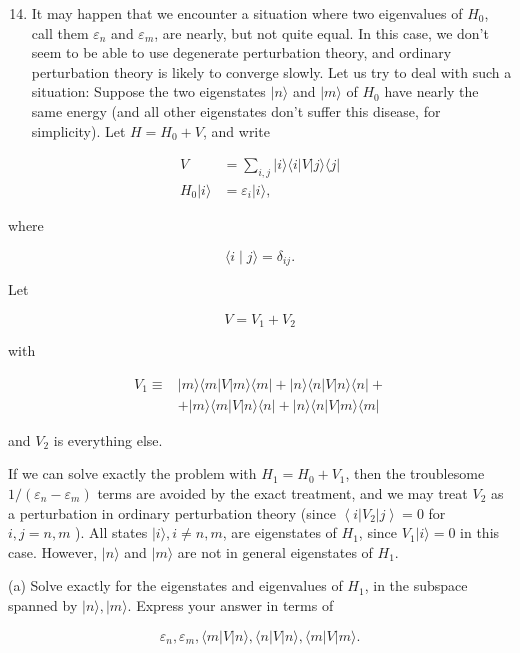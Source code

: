 \documentclass[12pt]{article}
\begin{document}
\begin{enumerate}
  \setcounter{enumi}{13}
  \item It may happen that we encounter a situation where two eigenvalues of $H_{0}$, call them $\varepsilon_{n}$ and $\varepsilon_{m}$, are nearly, but not quite equal. In this case, we don't seem to be able to use degenerate perturbation theory, and ordinary perturbation theory is likely to converge slowly. Let us try to deal with such a situation: Suppose the two eigenstates $|n\rangle$ and $|m\rangle$ of $H_{0}$ have nearly the same energy (and all other eigenstates don't suffer this disease, for simplicity). Let $H=H_{0}+V$, and write
\end{enumerate}

$$
\begin{aligned}
V & =\sum_{i, j}|i\rangle\langle i|V| j\rangle\langle j| \\
H_{0}|i\rangle & =\varepsilon_{i}|i\rangle,
\end{aligned}
$$

where

$$
\langle i \mid j\rangle=\delta_{i j} .
$$

Let

$$
V=V_{1}+V_{2}
$$

with

$$
\begin{aligned}
V_{1} \equiv & |m\rangle\langle m|V| m\rangle\langle m|+| n\rangle\langle n|V| n\rangle\langle n|+ \\
& +|m\rangle\langle m|V| n\rangle\langle n|+| n\rangle\langle n|V| m\rangle\langle m|
\end{aligned}
$$

and $V_{2}$ is everything else.

If we can solve exactly the problem with $H_{1}=H_{0}+V_{1}$, then the troublesome $1 /\left(\varepsilon_{n}-\varepsilon_{m}\right)$ terms are avoided by the exact treatment, and we may treat $V_{2}$ as a perturbation in ordinary perturbation theory (since $\left\langle i\left|V_{2}\right| j\right\rangle=0$ for $i, j=n, m$ ). All states $|i\rangle, i \neq n, m$, are eigenstates of $H_{1}$, since $V_{1}|i\rangle=0$ in this case. However, $|n\rangle$ and $|m\rangle$ are not in general eigenstates of $H_{1}$.

(a) Solve exactly for the eigenstates and eigenvalues of $H_{1}$, in the subspace spanned by $|n\rangle,|m\rangle$. Express your answer in terms of

$$
\varepsilon_{n}, \varepsilon_{m},\langle m|V| n\rangle,\langle n|V| n\rangle,\langle m|V| m\rangle .
$$
\end{document}
